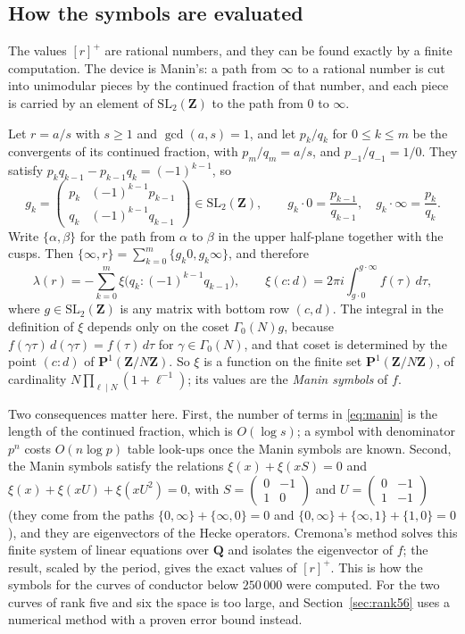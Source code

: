 \documentclass[11pt]{amsart}
\theoremstyle{definition}
\newcommand{\Q}{\mathbf{Q}}
\newcommand{\Z}{\mathbf{Z}}
\newcommand{\SL}{\mathrm{SL}}
\begin{document}
\subsection{How the symbols are evaluated}\label{ssec:manin}
The values $[r]^+$ are rational numbers, and they can be found exactly by a finite computation. The device is Manin's: a path from $\infty$ to a rational number is cut into unimodular pieces by the continued fraction of that number, and each piece is carried by an element of $\SL_2(\Z)$ to the path from $0$ to $\infty$.

Let $r=a/s$ with $s\ge1$ and $\gcd(a,s)=1$, and let $p_k/q_k$ for $0\le k\le m$ be the convergents of its continued fraction, with $p_m/q_m=a/s$, and $p_{-1}/q_{-1}=1/0$. They satisfy $p_kq_{k-1}-p_{k-1}q_k=(-1)^{k-1}$, so
\[
g_k=\begin{pmatrix}p_k&(-1)^{k-1}p_{k-1}\\ q_k&(-1)^{k-1}q_{k-1}\end{pmatrix}\in\SL_2(\Z),\qquad g_k\cdot0=\frac{p_{k-1}}{q_{k-1}},\quad g_k\cdot\infty=\frac{p_k}{q_k}.
\]
Write $\{\alpha,\beta\}$ for the path from $\alpha$ to $\beta$ in the upper half-plane together with the cusps. Then $\{\infty,r\}=\sum_{k=0}^{m}\{g_k0,g_k\infty\}$, and therefore
\begin{equation}\label{eq:manin}
\lambda(r)=-\sum_{k=0}^{m}\xi\bigl(q_k:(-1)^{k-1}q_{k-1}\bigr),\qquad \xi(c:d)=2\pi i\int_{g\cdot0}^{g\cdot\infty}f(\tau)\,d\tau ,
\end{equation}
where $g\in\SL_2(\Z)$ is any matrix with bottom row $(c,d)$. The integral in the definition of $\xi$ depends only on the coset $\Gamma_0(N)g$, because $f(\gamma\tau)\,d(\gamma\tau)=f(\tau)\,d\tau$ for $\gamma\in\Gamma_0(N)$, and that coset is determined by the point $(c:d)$ of $\mathbf P^1(\Z/N\Z)$. So $\xi$ is a function on the finite set $\mathbf P^1(\Z/N\Z)$, of cardinality $N\prod_{\ell\mid N}(1+\ell^{-1})$; its values are the \emph{Manin symbols} of $f$.

Two consequences matter here. First, the number of terms in \eqref{eq:manin} is the length of the continued fraction, which is $O(\log s)$; a symbol with denominator $p^n$ costs $O(n\log p)$ table look-ups once the Manin symbols are known. Second, the Manin symbols satisfy the relations $\xi(x)+\xi(xS)=0$ and $\xi(x)+\xi(xU)+\xi(xU^2)=0$, with $S=\left(\begin{smallmatrix}0&-1\\1&0\end{smallmatrix}\right)$ and $U=\left(\begin{smallmatrix}0&-1\\1&-1\end{smallmatrix}\right)$ (they come from the paths $\{0,\infty\}+\{\infty,0\}=0$ and $\{0,\infty\}+\{\infty,1\}+\{1,0\}=0$), and they are eigenvectors of the Hecke operators. Cremona's method \cite[Ch.~2]{Cre97} solves this finite system of linear equations over $\Q$ and isolates the eigenvector of $f$; the result, scaled by the period, gives the exact values of $[r]^+$. This is how the symbols for the curves of conductor below $250\,000$ were computed. For the two curves of rank five and six the space is too large, and Section~\ref{sec:rank56} uses a numerical method with a proven error bound instead.
\end{document}
